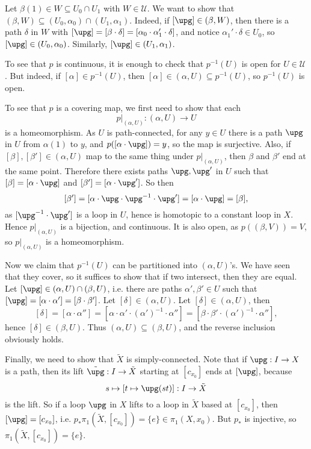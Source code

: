 \documentclass[12pt]{article}
\begin{document}
\begin{proofbox}
	Let $\beta(1) \in W \subseteq U_0 \cap U_1$ with $W \in \mathcal{U}$. We want to show that $(\beta, W) \subseteq (U_0, \alpha_0) \cap (U_1, \alpha_1)$. Indeed, if $[\upg] \in (\beta, W)$, then there is a path $\delta$ in $W$ with $[\upg] = [\beta \cdot \delta] = [\alpha_0 \cdot \alpha_1' \cdot \delta]$, and notice $\alpha_1' \cdot \delta \in U_0$, so $[\upg] \in (U_0, \alpha_0)$. Similarly, $[\upg] \in (U_1, \alpha_1)$.


	To see that $p$ is continuous, it is enough to check that $p^{-1}(U)$ is open for $U \in \mathcal{U}$. But indeed, if $[\alpha] \in p^{-1}(U)$, then $[\alpha] \in (\alpha, U) \subseteq p^{-1}(U)$, so $p^{-1}(U)$ is open.

	To see that $p$ is a covering map, we first need to show that each
	\[
	p|_{(\alpha, U)} : (\alpha, U) \to U
	\]
	is a homeomorphism. As $U$ is path-connected, for any $y \in U$ there is a path $\upg$ in $U$ from $\alpha(1)$ to $y$, and $p([\alpha \cdot \upg]) = y$, so the map is surjective. Also, if $[\beta], [\beta'] \in (\alpha, U)$ map to the same thing under $p|_{(\alpha, U)}$, then $\beta$ and $\beta'$ end at the same point. Therefore there exists paths $\upg, \upg'$ in $U$ such that $[\beta] = [\alpha \cdot \upg]$ and $[\beta'] = [\alpha \cdot \upg']$. So then
	\[
		[\beta'] = [\alpha \cdot \upg \cdot \upg^{-1} \cdot \upg'] = [\alpha \cdot \upg] = [\beta],
	\]
	as $[\upg^{-1} \cdot \upg']$ is a loop in $U$, hence is homotopic to a constant loop in $X$. Hence $p|_{(\alpha, U)}$ is a bijection, and continuous. It is also open, as $p((\beta, V)) = V$, so $p|_{(\alpha, U)}$ is a homeomorphism.

	Now we claim that $p^{-1}(U)$ can be partitioned into $(\alpha, U)$'s. We have seen that they cover, so it suffices to show that if two intersect, then they are equal. Let $[\upg] \in (\alpha, U) \cap (\beta, U)$, i.e. there are paths $\alpha', \beta' \in U$ such that $[\upg] = [\alpha \cdot \alpha'] = [\beta \cdot \beta']$. Let  $[\delta] \in (\alpha, U)$. Let $[\delta] \in (\alpha, U)$, then
	\[
		[\delta] = [\alpha \cdot \alpha''] = [\alpha \cdot \alpha' \cdot (\alpha')^{-1} \cdot \alpha''] = [\beta \cdot \beta' \cdot (\alpha')^{-1} \cdot \alpha''],
	\]
	hence $[\delta] \in (\beta, U)$. Thus $(\alpha, U) \subseteq (\beta, U)$, and the reverse inclusion obviously holds.

	Finally, we need to show that $\tilde X$ is simply-connected. Note that if $\upg : I \to X$ is a path, then its lift $\tilde \upg : I \to \tilde X$ starting at $[c_{x_0}]$ ends at $[\upg]$, because
	\[
		s \mapsto [t \mapsto \upg(st)] : I \to \tilde X
	\]
	is the lift. So if a loop $\upg$ in $X$ lifts to a loop in $\tilde X$ based at $[c_{x_0}]$, then $[\upg] = [c_{x_0}]$, i.e. $p_\ast \pi_1(\tilde X, [c_{x_0}]) = \{e\} \in \pi_1(X, x_0)$. But $p_\ast$ is injective, so $\pi_1(\tilde X, [c_{x_0}]) = \{e\}$.
\end{proofbox}
\end{document}

